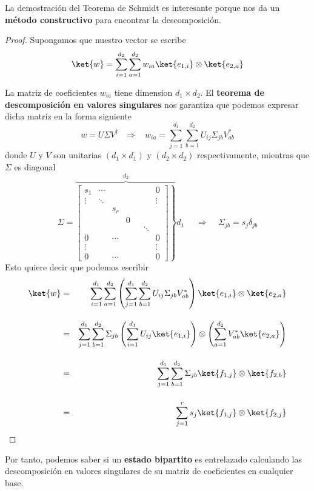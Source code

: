 \documentclass[a4paper,11pt]{book} %
\numberwithin{equation}{chapter}
\begin{document}
	La demostración del Teorema de Schmidt es interesante porque nos da un \textbf{método constructivo} para encontrar la descomposición. 

	\begin{proof}
Supongamos que nuestro vector se escribe
\begin{equation}
\ket{w} = \sum_{i=1}^{d_2}\sum_{a=1}^{d_2} w_{ia} \ket{e_{1,i}}\otimes \ket{e_{2,a}}
\end{equation}
\vspace{0.3cm}

La matriz de coeficientes $w_{ia}$ tiene  dimension $d_1\times d_2$. El \textbf{teorema de descomposición en valores singulares} nos garantiza que podemos expresar dicha matriz en la forma siguiente
\begin{equation}
w = U\Sigma V^\dagger ~~~\Rightarrow ~~~~w_{ia} = \sum_{j=1}^{d_1}\sum_{b=1}^{d_2} U_{ij}\Sigma_{jb}V_{ab}^*
\end{equation}
donde $U$ y $V$ son unitarias $(d_1\times d_1)$ y $(d_2\times d_2)$ respectivamente, mientras que $\Sigma$ es diagonal
\begin{equation}
\Sigma = 
\overbrace{\left.
\begin{bmatrix}
s_1 &\cdots  &    &  & & &  0  \\  \vdots & \ddots & & & & & \vdots  \\  & & s_r & & & &  \\
   & &  & 0  & &  &    \\ & & & & & \ddots &  \\  0 & &\cdots  & & & & 0  \\ \vdots & &&&& & \vdots \\ 0 & & \cdots & & & & 0
\end{bmatrix}   \right\}  }^{\displaystyle d_2} d_1 ~~~~~~\Rightarrow ~~~~~ \Sigma_{jb} = s_j\delta_{jb}
\end{equation}
Esto quiere decir que podemos escribir
\begin{eqnarray*}
\ket{w} &=& \sum_{i=1}^{d_1}\sum_{a=1}^{d_2}\left( \sum_{j=1}^{d_1}\sum_{b=1}^{d_2} U_{ij}\Sigma_{jb}V_{ab}^* \right)\ket{e_{1,i}}\otimes \ket{e_{2,a}}
\\  \rule{0mm}{10mm}
&=& \sum_{j=1}^{d_1}\sum_{b=1}^{d_2}\Sigma_{jb}\left( \sum_{i=1}^{d_1} U_{ij}\ket{e_{1,i}} \right)\otimes  \left( \sum_{a=1}^{d_2} V_{ab}^* \ket{e_{2,a}}\right)
\\   \rule{0mm}{10mm}
&=& \sum_{j=1}^{d_1}\sum_{b=1}^{d_2}\Sigma_{jb} \ket{f_{1,j}}\otimes \ket{f_{2,b}}\\   \rule{0mm}{10mm}
&=& \sum_{j=1}^r s_j \ket{f_{1,j}}\otimes \ket{f_{2,j}}
\end{eqnarray*}
	\end{proof}
Por tanto, podemos saber si un \textbf{estado bipartito} es entrelazado calculando las descomposición en valores singulares de su matriz de coeficientes en cualquier base. 
\end{document}
